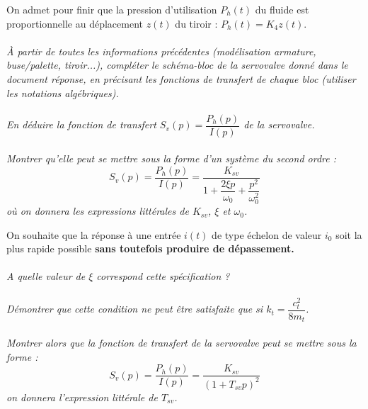 \documentclass[10pt,oneside]{article}
\begin{document}
On admet pour finir que la pression d'utilisation $P_h(t)$ du fluide est proportionnelle au déplacement $z(t)$
du tiroir : $P_h(t)=K_4 z(t)$.

\paragraph{}
\textit{\`A partir de toutes les informations précédentes (modélisation armature, buse/palette,
tiroir...), compléter le schéma-bloc de la servovalve donné dans le document réponse, en précisant les
fonctions de transfert de chaque bloc (utiliser les notations algébriques).}

\paragraph{}
\textit{En déduire la fonction de transfert $S_v(p)=\dfrac{P_h(p)}{I(p)}$ de la servovalve.}

\paragraph{}
\textit{Montrer qu'elle peut se mettre sous la forme d'un système du second ordre :}
$$
S_v(p)=\dfrac{P_h(p)}{I(p)}=\dfrac{K_{sv}}{1+\dfrac{2\xi p}{\omega_0}+\dfrac{p^2}{\omega_0^2}}
$$
\textit{où on donnera les expressions littérales de $K_{sv}$, $\xi$ et $\omega_0$.}

On souhaite que la réponse à une entrée $i(t)$ de type échelon de valeur $i_0$ soit la plus rapide possible \textbf{sans toutefois produire de dépassement.}

\paragraph{}
\textit{A quelle valeur de $\xi$ correspond cette spécification ?}

\paragraph{}
\textit{Démontrer que cette condition ne peut être satisfaite que si $k_t=\dfrac{c_t^2}{8m_t}$.}

\paragraph{}
\textit{Montrer alors que la fonction de transfert de la servovalve peut se mettre sous la forme :}
$$
S_v(p)=\dfrac{P_h (p)}{I(p)}=\dfrac{K_{sv}}{\left( 1+T_{sv} p\right)^2 }
$$
\textit{on donnera l'expression littérale de $T_{sv}$.}
\end{document}
